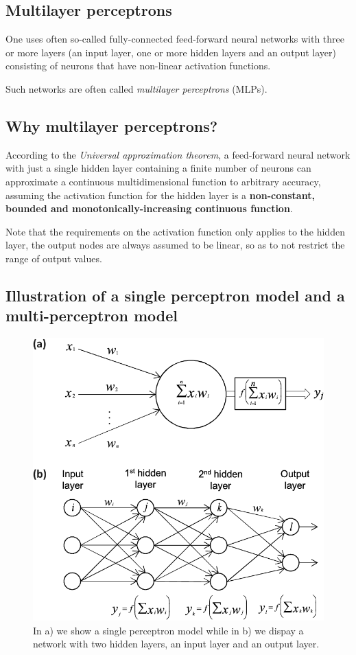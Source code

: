 \documentclass[%
oneside,                 %
final,                   %
10pt]{article}
\begin{document}
\subsection{Multilayer perceptrons}

One uses often so-called fully-connected feed-forward neural networks
with three or more layers (an input layer, one or more hidden layers
and an output layer) consisting of neurons that have non-linear
activation functions.

Such networks are often called \emph{multilayer perceptrons} (MLPs).

\subsection{Why multilayer perceptrons?}

According to the \emph{Universal approximation theorem}, a feed-forward
neural network with just a single hidden layer containing a finite
number of neurons can approximate a continuous multidimensional
function to arbitrary accuracy, assuming the activation function for
the hidden layer is a \textbf{non-constant, bounded and
monotonically-increasing continuous function}.

Note that the requirements on the activation function only applies to
the hidden layer, the output nodes are always assumed to be linear, so
as to not restrict the range of output values.

\subsection{Illustration of a single perceptron model and a multi-perceptron model}

\begin{figure}[!ht]  %
  \centerline{\includegraphics[width=0.8\linewidth]{figures/nns.png}}
  \caption{
  In a) we show a single perceptron model while in b) we dispay a network with two  hidden layers, an input layer and an output layer.
  }
\end{figure}
\end{document}
